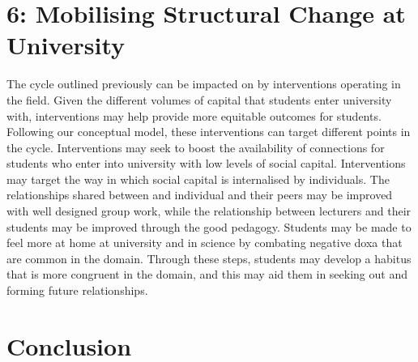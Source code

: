 \section{6: Mobilising Structural Change at University}
The cycle outlined previously can be impacted on by interventions operating in the field. Given the different volumes of capital that students enter university with, interventions may help provide more equitable outcomes for students. Following our conceptual model, these interventions can target different points in the cycle. Interventions may seek to boost the availability of connections for students who enter into university with low levels of social capital. Interventions may target the way in which social capital is internalised by individuals. The relationships shared between and individual and their peers may be improved with well designed group work, while the relationship between lecturers and their students may be improved through the good pedagogy. Students may be made to feel more at home at university and in science by combating negative doxa that are common in the domain. Through these steps, students may develop a habitus that is more congruent in the domain, and this may aid them in seeking out and forming future relationships.

\section{Conclusion}



